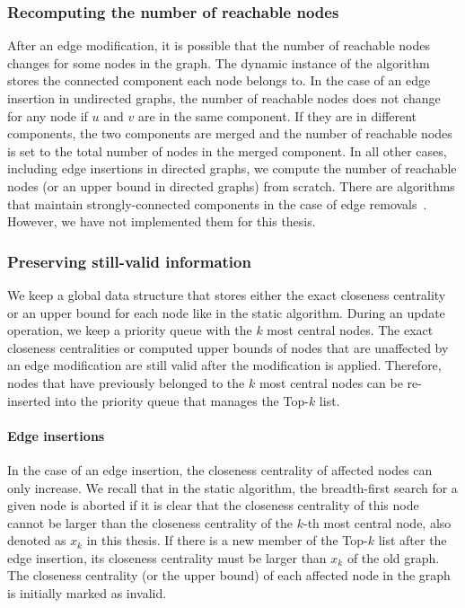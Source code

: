 \subsubsection{Recomputing the number of reachable nodes}
After an edge modification, it is possible that the number of reachable nodes changes for some nodes in the graph. The dynamic instance of the algorithm stores the connected component each node belongs to. In the case of an edge insertion in undirected graphs, the number of reachable nodes does not change for any node if $u$ and $v$ are in the same component. If they are in different components, the two components are merged and the number of reachable nodes is set to the total number of nodes in the merged component. In all other cases, including edge insertions in directed graphs, we compute the number of reachable nodes (or an upper bound in directed graphs) from scratch. There are algorithms that maintain strongly-connected components in the case of edge removals~\cite{lkacki2013improved,chechik2016decremental}. However, we have not implemented them for this thesis.

\subsubsection{Preserving still-valid information}
We keep a global data structure that stores either the exact closeness centrality or an upper bound for each node like in the static algorithm. During an update operation, we keep a priority queue with the $k$ most central nodes. The exact closeness centralities or computed upper bounds of nodes that are unaffected by an edge modification are still valid after the modification is applied. Therefore, nodes that have previously belonged to the $k$ most central nodes can be re-inserted into the priority queue that manages the Top-$k$ list.

\paragraph{Edge insertions}
In the case of an edge insertion, the closeness centrality of affected nodes can only increase.  We recall that in the static algorithm, the breadth-first search for a given node is aborted if it is clear that the closeness centrality of this node cannot be larger than the closeness centrality of the $k$-th most central node, also denoted as $x_k$ in this thesis. If there is a new member of the Top-$k$ list after the edge insertion, its closeness centrality must be larger than $x_k$ of the old graph. The closeness centrality (or the upper bound) of each affected node in the graph is initially marked as invalid. 

